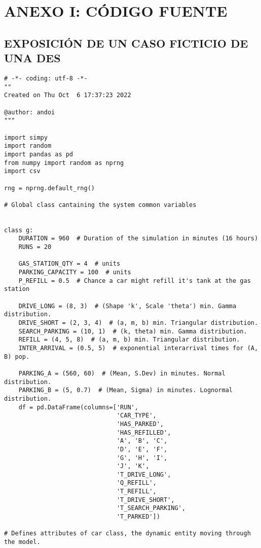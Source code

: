 \appendix
\section{ANEXO I: CÓDIGO FUENTE}
\subsection{EXPOSICIÓN DE UN CASO FICTICIO DE UNA DES}\label{apnd1}

\begin{verbatim}
# -*- coding: utf-8 -*-
""
Created on Thu Oct  6 17:37:23 2022

@author: andoi
"""

import simpy
import random
import pandas as pd
from numpy import random as nprng
import csv

rng = nprng.default_rng()

# Global class cantaining the system common variables


class g:
    DURATION = 960  # Duration of the simulation in minutes (16 hours)
    RUNS = 20

    GAS_STATION_QTY = 4  # units
    PARKING_CAPACITY = 100  # units
    P_REFILL = 0.5  # Chance a car might refill it's tank at the gas station

    DRIVE_LONG = (8, 3)  # (Shape 'k', Scale 'theta') min. Gamma distribution.
    DRIVE_SHORT = (2, 3, 4)  # (a, m, b) min. Triangular distribution.
    SEARCH_PARKING = (10, 1)  # (k, theta) min. Gamma distribution.
    REFILL = (4, 5, 8)  # (a, m, b) min. Triangular distribution.
    INTER_ARRIVAL = (0.5, 5)  # exponential interarrival times for (A, B) pop.

    PARKING_A = (560, 60)  # (Mean, S.Dev) in minutes. Normal distribution.
    PARKING_B = (5, 0.7)  # (Mean, Sigma) in minutes. Lognormal distribution.
    df = pd.DataFrame(columns=['RUN',
                               'CAR_TYPE',
                               'HAS_PARKED',
                               'HAS_REFILLED',
                               'A', 'B', 'C',
                               'D', 'E', 'F',
                               'G', 'H', 'I',
                               'J', 'K',
                               'T_DRIVE_LONG',
                               'Q_REFILL',
                               'T_REFILL',
                               'T_DRIVE_SHORT',
                               'T_SEARCH_PARKING',
                               'T_PARKED'])

# Defines attributes of car class, the dynamic entity moving through the model.



\end{verbatim}

